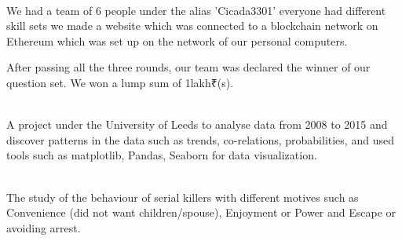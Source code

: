 \documentclass[a4paper]{themagicaltemplate}
\begin{document}
\begin{minipage}[t]{0.66\textwidth}

 \\
\vspace{\topsep} %
\begin{tightemize}
\item We had a team of 6 people under the alias 'Cicada3301' everyone had different skill sets we made a website which was connected to a blockchain network on Ethereum which was set up on the network of our personal computers. 
\item  After passing all the three rounds, our team was declared the winner of our question set. We won a lump sum of 1lakh₹(s).  
\end{tightemize}
\sectionsep


 \\
 A project under the University of Leeds to analyse data from 2008 to 2015 and discover patterns in the data such as trends, co-relations, probabilities, and used tools such as matplotlib, Pandas, Seaborn for data visualization.
\sectionsep

 \\
The study of the behaviour of serial killers with different motives such as Convenience (did not want children/spouse), Enjoyment or Power and Escape or avoiding arrest.
\end{minipage} 
\end{document}
